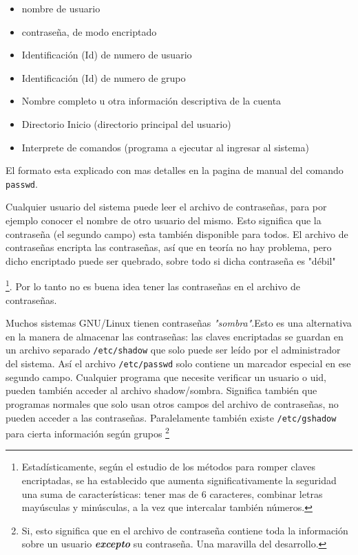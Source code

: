 \documentclass[12pt]{article}
\begin{document}
	\begin{itemize}
	
	\item{nombre de usuario}
	\item{contraseña, de modo encriptado}
	\item{Identificación (Id) de numero de usuario} 
	\item{Identificación (Id) de numero de grupo} 
	\item{Nombre completo u otra información descriptiva de la cuenta}
	\item{Directorio Inicio (directorio principal del usuario)}
	\item{Interprete de comandos (programa a ejecutar al ingresar al sistema)}

	\end{itemize}

El formato esta explicado con mas detalles en la pagina de manual del comando
\texttt{passwd}.

Cualquier usuario del sistema puede leer el archivo de contraseñas, para
por ejemplo conocer el nombre de otro usuario del mismo. Esto significa que la
contraseña (el segundo campo) esta también disponible para todos. El archivo de
contraseñas encripta las contraseñas, así que en teoría no hay problema, pero
dicho encriptado puede ser quebrado, sobre todo si dicha contraseña es
"débil"

	\footnote{ Estadísticamente, según el estudio de
los métodos para romper claves encriptadas, se ha establecido que aumenta
significativamente la seguridad una suma de características: tener mas de 6
caracteres, combinar letras mayúsculas y minúsculas, a la vez que intercalar
también números.}.  Por lo tanto no es buena idea tener las contraseñas en el archivo
de contraseñas.

Muchos sistemas GNU/Linux tienen contraseñas
\textit{"sombra"}.Esto es una  alternativa en la manera de
almacenar las contraseñas: las claves encriptadas se guardan en un archivo
separado \texttt{/etc/shadow} que solo puede ser leído por el
administrador del sistema. Así el archivo \texttt{/etc/passwd} solo
contiene un marcador especial en ese segundo campo. Cualquier programa que
necesite verificar un usuario o uid, pueden también acceder al archivo
shadow/sombra.  Significa también que programas normales que solo usan otros
campos del archivo de contraseñas, no pueden acceder a las contraseñas.
Paralelamente también existe \texttt{/etc/gshadow} para cierta
información según grupos	\footnote{
 Si, esto significa que en el archivo de contraseña contiene toda la
información sobre un usuario \textit{\bf excepto} su contraseña. Una maravilla del
desarrollo.}
\end{document}
